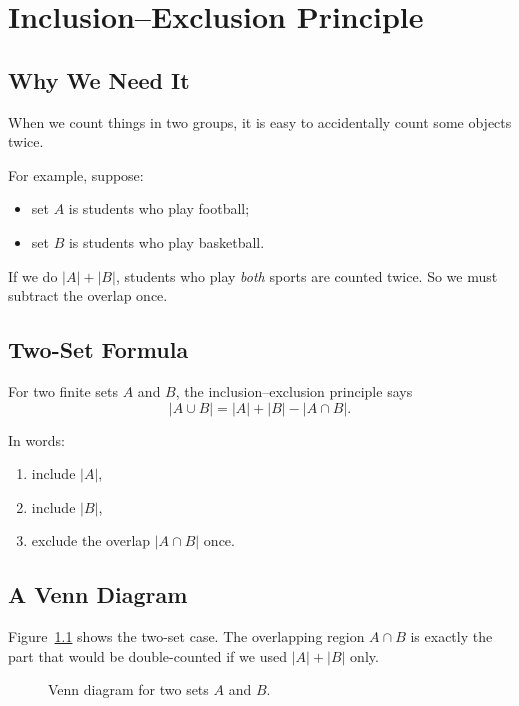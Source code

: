 \chapter{Inclusion--Exclusion Principle}

\section{Why We Need It}
When we count things in two groups, it is easy to accidentally count some
objects twice.

For example, suppose:
\begin{itemize}
  \item set \(A\) is students who play football;
  \item set \(B\) is students who play basketball.
\end{itemize}

If we do \(|A| + |B|\), students who play \emph{both} sports are counted twice.
So we must subtract the overlap once.

\section{Two-Set Formula}
For two finite sets \(A\) and \(B\), the inclusion--exclusion principle says
\[
  |A \cup B| = |A| + |B| - |A \cap B|.
\]

In words:
\begin{enumerate}
  \item include \(|A|\),
  \item include \(|B|\),
  \item exclude the overlap \(|A \cap B|\) once.
\end{enumerate}

\section{A Venn Diagram}
Figure~\ref{fig:venn-two-sets} shows the two-set case.  The overlapping region
\(A \cap B\) is exactly the part that would be double-counted if we used
\(|A|+|B|\) only.

\begin{figure}[htbp]
  \centering
  \caption{Venn diagram for two sets \(A\) and \(B\).}
  \label{fig:venn-two-sets}
\end{figure}


